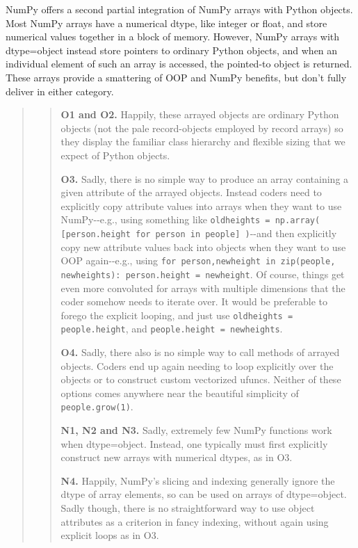 \documentclass[letterpaper,compsoc,twoside]{IEEEtran}
\begin{document}
NumPy offers a second partial integration of NumPy arrays with Python objects.  Most NumPy arrays have a numerical dtype, like integer or float, and store numerical values together in a block of memory.  However, NumPy arrays with dtype=object instead store pointers to ordinary Python objects, and when an individual element of such an array is accessed, the pointed-to object is returned.  These arrays provide a smattering of OOP and NumPy benefits, but don't fully deliver in either category.\begin{quotation}%
\begin{quote}


\textbf{O1 and O2.}  Happily, these arrayed objects are ordinary Python objects (not the pale \textquotedbl{}record-objects\textquotedbl{} employed by record arrays) so they display the familiar class hierarchy and flexible sizing that we expect of Python objects.

\textbf{O3.}  Sadly, there is no simple way to produce an array containing a given attribute of the arrayed objects.  Instead coders need to explicitly copy attribute values into arrays when they want to use NumPy-{}-e.g., using something like \texttt{oldheights = np.array( {[}person.height for person in people{]} )}-{}-and then explicitly copy new attribute values back into objects when they want to use OOP again-{}-e.g.,  using \texttt{for person,newheight in zip(people, newheights): person.height = newheight}.  Of course, things get even more convoluted for arrays with multiple dimensions that the coder somehow needs to iterate over.  It would be preferable to forego the explicit looping, and just use \texttt{oldheights = people.height}, and \texttt{people.height = newheights}.

\textbf{O4.}  Sadly, there also is no simple way to call methods of arrayed objects.  Coders end up again needing to loop explicitly over the objects or to construct custom vectorized \textquotedbl{}ufuncs\textquotedbl{}.  Neither of these options comes anywhere near the beautiful simplicity of \texttt{people.grow(1)}.

\textbf{N1, N2 and N3.}  Sadly, extremely few NumPy functions work when dtype=object.  Instead, one typically must first explicitly construct new arrays with numerical dtypes, as in O3.

\textbf{N4.}  Happily, NumPy's slicing and indexing generally ignore the dtype of array elements, so can be used on arrays of dtype=object.  Sadly though, there is no straightforward way to use object attributes as a criterion in \textquotedbl{}fancy indexing\textquotedbl{}, without again using explicit loops as in O3.
\end{quote}
\end{quotation}
\end{document}
